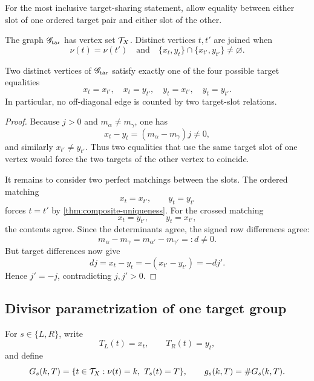 For the most inclusive target-sharing statement, allow equality
between either slot of one ordered target pair and either slot of the
other.

\begin{definition}
\label{def:target-graph}
The graph \(\mathscr G_{\mathrm{tar}}\) has vertex set \(\mathcal T_X\).  Distinct
vertices \(t,t'\) are joined when
\[
 \nu(t)=\nu(t')
 \quad\text{and}\quad
 \{x_t,y_t\}\cap\{x_{t'},y_{t'}\}\ne\varnothing.
\]
\end{definition}

\begin{lemma}
\label{lem:one-shared-target}
Two distinct vertices of \(\mathscr G_{\mathrm{tar}}\) satisfy exactly one
of the four possible target equalities
\[
 x_t=x_{t'},\quad x_t=y_{t'},\quad
 y_t=x_{t'},\quad y_t=y_{t'}.
\]
In particular, no off-diagonal edge is counted by two target-slot
relations.
\end{lemma}

\begin{proof}
Because \(j>0\) and \(m_\alpha\ne m_\gamma\), one has
\[
 x_t-y_t=(m_\alpha-m_\gamma)j\ne0,
\]
and similarly \(x_{t'}\ne y_{t'}\).  Thus two equalities that use the
same target slot of one vertex would force the two targets of the
other vertex to coincide.

It remains to consider two perfect matchings between the slots.  The
ordered matching
\[
 x_t=x_{t'},\qquad y_t=y_{t'}
\]
forces \(t=t'\) by \cref{thm:composite-uniqueness}.  For the crossed
matching
\[
 x_t=y_{t'},\qquad y_t=x_{t'},
\]
the contents agree.  Since the determinants agree, the signed row
differences agree:
\[
 m_\alpha-m_\gamma
 =
 m_{\alpha'}-m_{\gamma'}=:d\ne0.
\]
But target differences now give
\[
 dj=x_t-y_t
 =-(x_{t'}-y_{t'})
 =-dj'.
\]
Hence \(j'=-j\), contradicting \(j,j'>0\).
\end{proof}

\subsection{Divisor parametrization of one target group}

For \(s\in\{L,R\}\), write
\[
 T_L(t)=x_t,\qquad T_R(t)=y_t,
\]
and define
\begin{equation}
 G_s(k,T)
 =
 \{t\in\mathcal T_X:\nu(t)=k,\ T_s(t)=T\},
\qquad
 g_s(k,T)=\#G_s(k,T).
\label{eq:target-groups}
\end{equation}

